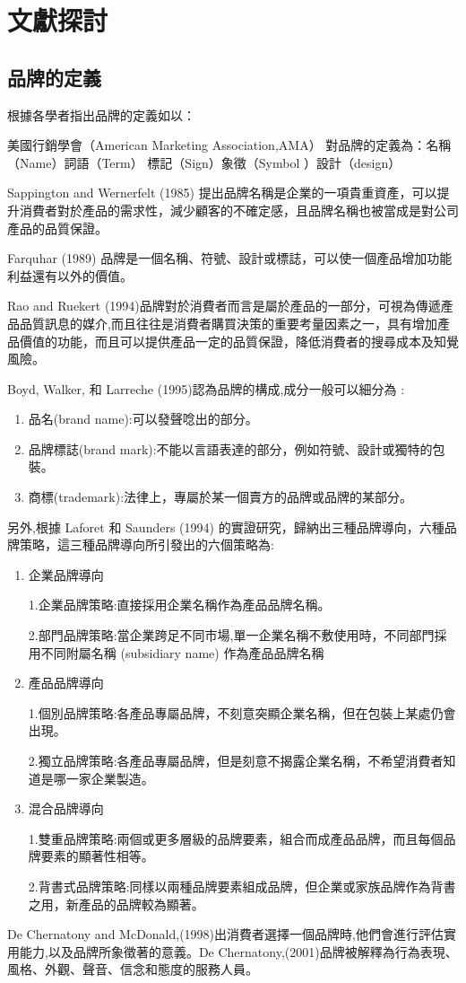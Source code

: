\chapter{文獻探討}


\section{品牌的定義}

根據各學者指出品牌的定義如以：

美國行銷學會（American Marketing Association,AMA）
對品牌的定義為\cite{AMA}：名稱 （Name）詞語（Term） 標記（Sign）象徵（Symbol ）設計（design）

Sappington and Wernerfelt (1985) 提出品牌名稱是企業的一項貴重資產，可以提升消費者對於產品的需求性，減少顧客的不確定感，且品牌名稱也被當成是對公司產品的品質保證\cite{Sappington}。

Farquhar (1989) 品牌是一個名稱、符號、設計或標誌，可以使一個產品增加功能利益還有以外的價值\cite{Farquhar}。



Rao and Ruekert (1994)品牌對於消費者而言是屬於產品的一部分，可視為傳遞產品品質訊息的媒介,而且往往是消費者購買決策的重要考量因素之一，具有增加產品價值的功能，而且可以提供產品一定的品質保證，降低消費者的搜尋成本及知覺風險\cite{Rao}。 

Boyd, Walker, 和 Larreche (1995)認為品牌的構成,成分一般可以細分為\cite{Boyd} :
\begin{enumerate}
\item 品名(brand name):可以發聲唸出的部分。
\item 品牌標誌(brand mark):不能以言語表達的部分，例如符號、設計或獨特的包裝。 
\item 商標(trademark):法律上，專屬於某一個賣方的品牌或品牌的某部分。
\end{enumerate}

另外,根據 Laforet 和 Saunders (1994) 的實證研究，歸納出三種品牌導向，六種品牌策略，這三種品牌導向所引發出的六個策略為\cite{Laforet}:
\begin{enumerate}
\item 企業品牌導向

1.企業品牌策略:直接採用企業名稱作為產品品牌名稱。 

2.部門品牌策略:當企業跨足不同市場,單一企業名稱不敷使用時，不同部門採用不同附屬名稱 (subsidiary name) 作為產品品牌名稱
\item 產品品牌導向

1.個別品牌策略:各產品專屬品牌，不刻意突顯企業名稱，但在包裝上某處仍會出現。

2.獨立品牌策略:各產品專屬品牌，但是刻意不揭露企業名稱，不希望消費者知道是哪一家企業製造。
\item 混合品牌導向

1.雙重品牌策略:兩個或更多層級的品牌要素，組合而成產品品牌，而且每個品牌要素的顯著性相等。

2.背書式品牌策略:同樣以兩種品牌要素組成品牌，但企業或家族品牌作為背書之用，新產品的品牌較為顯著。
\end{enumerate}
De Chernatony and McDonald,(1998)出消費者選擇一個品牌時,他們會進行評估實用能力,以及品牌所象徵著的意義\cite{Chernatony1998}。De Chernatony,(2001)品牌被解釋為行為表現、風格、外觀、聲音、信念和態度的服務人員\cite{Chernatony2001}。

